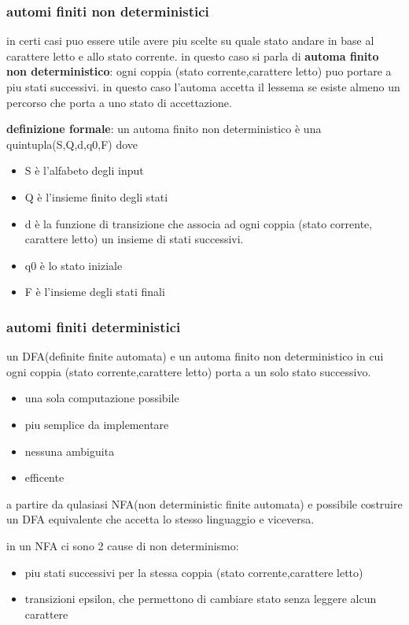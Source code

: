 \documentclass[12pt]{article}
\begin{document}
\subsubsection{automi finiti non deterministici}

in certi casi puo essere utile avere piu scelte su quale stato andare in base al carattere letto e allo stato corrente.
in questo caso si parla di \textbf{automa finito non deterministico}: ogni coppia (stato corrente,carattere letto) puo portare a piu stati successivi.
in questo caso l'automa accetta il lessema se esiste almeno un percorso che porta a uno stato di accettazione.

\textbf{definizione formale}: un automa finito non deterministico è una quintupla(S,Q,d,q0,F) dove 

\begin{itemize}
\item S è l'alfabeto degli input
\item Q è l'insieme finito degli stati
\item d è la funzione di transizione che associa ad ogni coppia (stato corrente, carattere letto) un insieme di stati successivi.
\item q0 è lo stato iniziale
\item F è l'insieme degli stati finali
\end{itemize}

\subsubsection{automi finiti deterministici}
un DFA(definite finite automata) e un automa finito non deterministico in cui ogni coppia (stato corrente,carattere letto) porta a un solo stato successivo.
\begin{itemize}
\item una sola computazione possibile
\item piu semplice da implementare
\item nessuna ambiguita
\item efficente
\end{itemize}

a partire da qulasiasi NFA(non deterministic finite automata) e possibile costruire un DFA equivalente che accetta lo stesso linguaggio e viceversa.

in un NFA ci sono 2 cause di non determinismo:
\begin{itemize}
\item   piu stati successivi per la stessa coppia (stato corrente,carattere letto)
\item transizioni epsilon, che permettono di cambiare stato senza leggere alcun carattere
\end{itemize}       
\end{document}
